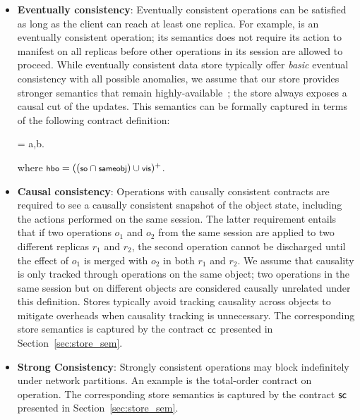 \begin{itemize}
\setlength{\itemsep}{2pt}

\item \textbf{Eventually consistency}: Eventually consistent operations can
  be satisfied as long as the client can reach at least one replica. For
  example,  is an eventually consistent operation; its semantics
  does not require its action to manifest on all replicas before other
  operations in its session are allowed to proceed. While eventually
  consistent data store typically offer \emph{basic} eventual consistency
  with all possible anomalies, we assume that our store provides stronger
  semantics that remain highly-available~\cite{BailisHAT,COPS}; the store
  always exposes a causal cut of the updates. This semantics can be formally
  captured in terms of the following contract definition:
\vspace{-1em}
\begin{smathpar}
\ecc = \forall a,b.  \wedge {} \Rightarrow {}
\end{smathpar}
\noindent where $\small \hboZ = ((\soZ \cap \sameobjZ) \cup \visZ)^+$.

\item \textbf{Causal consistency}: Operations with causally consistent
  contracts are required to see a causally consistent snapshot of the object
  state, including the actions performed on the same session.  The latter
  requirement entails that if two operations $o_1$ and $o_2$ from the same
  session are applied to two different replicas $r_1$ and $r_2$, the second
  operation cannot be discharged until the effect of $o_1$ is merged with
  $o_2$ in both $r_1$ and $r_2$.  We assume that causality is only tracked
  through operations on the same object; two operations in the same session
  but on different objects are considered causally unrelated under this
  definition. Stores typically avoid tracking causality across objects to
  mitigate overheads when causality tracking is unnecessary.  The corresponding
  store semantics is captured by the contract ${\sf cc}$ presented in
  Section~\ref{sec:store_sem}.

\item \textbf{Strong Consistency}: Strongly consistent operations may block
  indefinitely under network partitions. An example is the total-order
  contract on  operation. The corresponding store semantics is
  captured by the contract ${\sf sc}$ presented in Section~\ref{sec:store_sem}.

\end{itemize}

